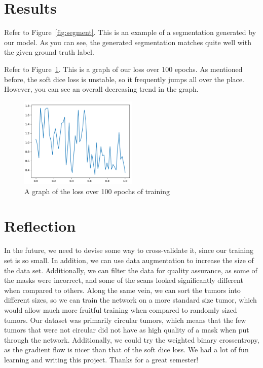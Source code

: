 \documentclass[12pt, letterpaper]{article}
\begin{document}
	\section{Results}
Refer to Figure~\ref{fig:segment}. This is an example of a segmentation generated by our model. As you can see, the generated segmentation matches quite well with the given ground truth label.\par
Refer to Figure~\ref{fig:loss}. This is a graph of our loss over 100 epochs. As mentioned before, the soft dice loss is unstable, so it frequently jumps all over the place. However, you can see an overall decreasing trend in the graph.
	\begin{figure}[h]
		\centering
		\includegraphics[width=0.5\textwidth]{img/loss.png}
		\caption{A graph of the loss over 100 epochs of training}
		\label{fig:loss}
	\end{figure}
	\section{Reflection}
In the future, we need to devise some way to cross-validate it, since our training set is so small. In addition, we can use data augmentation to increase the size of the data set. Additionally, we can filter the data for quality assurance, as some of the masks were incorrect, and some of the scans looked significantly different when compared to others. Along the same vein, we can sort the tumors into different sizes, so we can train the network on a more standard size tumor, which would allow much more fruitful training when compared to randomly sized tumors. Our dataset was primarily circular tumors, which means that the few tumors that were not circular did not have as high quality of a mask when put through the network. Additionally, we could try the weighted binary crossentropy, as the gradient flow is nicer than that of the soft dice loss. We had a lot of fun learning and writing this project. Thanks for a great semester!
\end{document}
